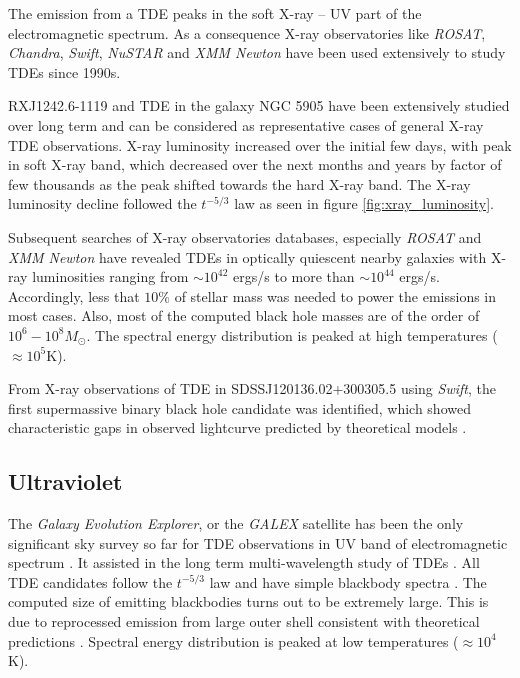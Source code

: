 \documentclass{tda}
\begin{document}
The emission from a TDE peaks in the soft X-ray -- UV part of the electromagnetic spectrum. As a consequence X-ray observatories like \textit{ROSAT}, \textit{Chandra}, \textit{Swift}, \textit{NuSTAR} and \textit{XMM Newton} have been used extensively to study TDEs since 1990s.

RXJ1242.6-1119 and TDE in the galaxy NGC 5905 have been extensively studied over long term and can be considered as representative cases of general X-ray TDE observations. X-ray luminosity increased over the initial few days, with peak in soft X-ray band, which decreased over the next months and years by factor of few thousands as the peak shifted towards the hard X-ray band. The X-ray luminosity decline followed the \(t^{-5/3}\) law \cite{komossa_tidal_2015} as seen in figure \ref{fig:xray_luminosity}.

Subsequent searches of X-ray observatories databases, especially \textit{ROSAT} and \textit{XMM Newton} have revealed TDEs in optically quiescent nearby galaxies \cite[see references in][]{komossa_tidal_2015} with X-ray luminosities ranging from \(\sim 10^{42}\) ergs/s to more than \(\sim 10^{44}\) ergs/s. Accordingly, less that \(10\%\) of stellar mass was needed to power the emissions in most cases. Also, most of the computed black hole masses are of the order of \(10^6 - 10^8 M_{\odot}\). The spectral energy distribution is peaked at high temperatures (\(\approx 10^5\)K).

From X-ray observations of TDE in SDSSJ120136.02+300305.5 using \textit{Swift}, the first supermassive binary black hole candidate was identified, which showed characteristic gaps in observed lightcurve predicted by theoretical models \cite{liu_miliparsec_2014}.


\subsection{Ultraviolet} \label{multiwave:uv}

The \textit{Galaxy Evolution Explorer}, or the \textit{GALEX} satellite has been the only significant sky survey so far for TDE observations in UV band of electromagnetic spectrum \cite{van_velzen_optical-ultraviolet_2020}. It assisted in the long term multi-wavelength study of TDEs \cite{gezari_ultraviolet_2006}. All TDE candidates follow the \(t^{-5/3}\) law and have simple blackbody spectra \cite{nicholas_chamberlain_stone_tidal_2013}. The computed size of emitting blackbodies turns out to be extremely large. This is due to reprocessed emission from large outer shell consistent with theoretical predictions \cite{ulmer_flares_1999}. Spectral energy distribution is peaked at low temperatures (\(\approx 10^4\)K).
\end{document}
